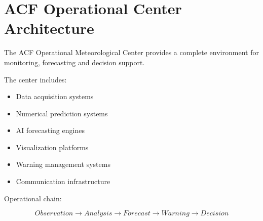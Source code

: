 \section{ACF Operational Center Architecture}


The ACF Operational Meteorological Center provides a complete
environment for monitoring, forecasting and decision support.



The center includes:


\begin{itemize}

\item Data acquisition systems

\item Numerical prediction systems

\item AI forecasting engines

\item Visualization platforms

\item Warning management systems

\item Communication infrastructure

\end{itemize}



Operational chain:


\begin{equation}
Observation
\rightarrow
Analysis
\rightarrow
Forecast
\rightarrow
Warning
\rightarrow
Decision
\end{equation}

